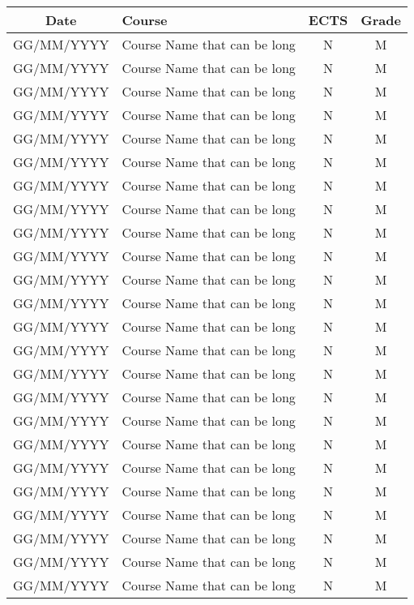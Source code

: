 \begin{center}
\begin{onehalfspace}
\begin{tabular}{ c m{9.5cm} c c }
  \textbf{Date} & \textbf{Course} & \textbf{ECTS} & \textbf{Grade}\\\hline
  GG/MM/YYYY & Course Name that can be long & N & M \\\hline
  GG/MM/YYYY & Course Name that can be long & N & M \\\hline
  GG/MM/YYYY & Course Name that can be long & N & M \\\hline
  GG/MM/YYYY & Course Name that can be long & N & M \\\hline
  GG/MM/YYYY & Course Name that can be long & N & M \\\hline
  GG/MM/YYYY & Course Name that can be long & N & M \\\hline
  GG/MM/YYYY & Course Name that can be long & N & M \\\hline
  GG/MM/YYYY & Course Name that can be long & N & M \\\hline
  GG/MM/YYYY & Course Name that can be long & N & M \\\hline
  GG/MM/YYYY & Course Name that can be long & N & M \\\hline
  GG/MM/YYYY & Course Name that can be long & N & M \\\hline
  GG/MM/YYYY & Course Name that can be long & N & M \\\hline
  GG/MM/YYYY & Course Name that can be long & N & M \\\hline
  GG/MM/YYYY & Course Name that can be long & N & M \\\hline
  GG/MM/YYYY & Course Name that can be long & N & M \\\hline
  GG/MM/YYYY & Course Name that can be long & N & M \\\hline
  GG/MM/YYYY & Course Name that can be long & N & M \\\hline
  GG/MM/YYYY & Course Name that can be long & N & M \\\hline
  GG/MM/YYYY & Course Name that can be long & N & M \\\hline
  GG/MM/YYYY & Course Name that can be long & N & M \\\hline
  GG/MM/YYYY & Course Name that can be long & N & M \\\hline
  GG/MM/YYYY & Course Name that can be long & N & M \\\hline
  GG/MM/YYYY & Course Name that can be long & N & M \\\hline
  GG/MM/YYYY & Course Name that can be long & N & M
\end{tabular}
\end{onehalfspace}
\end{center}

